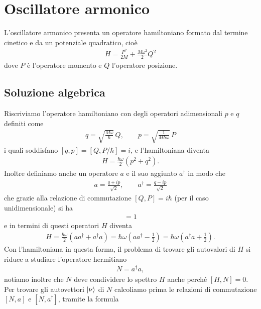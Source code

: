 \chapter{Oscillatore armonico}

L'oscillatore armonico presenta un operatore hamiltoniano formato dal termine cinetico e da un potenziale quadratico, cioè
\begin{align*}
  H = \frac{P^2}{2M} + \frac{M\omega^2}2 Q^2
\end{align*}
dove $ P $ è l'operatore momento e $ Q $ l'operatore posizione.

\section{Soluzione algebrica}

Riscriviamo l'operatore hamiltoniano con degli operatori adimensionali $ p $ e $ q $ definiti come 
\begin{align*}
  q = \sqrt{\frac{M\omega}\hbar} \, Q, \qquad p = \sqrt{\frac1{M\hbar\omega}} \, P
\end{align*}
i quali soddisfano $ [q, p] = [Q, P/\hbar] = i $, e l'hamiltoniana diventa
\begin{align*}
  H = \frac{\hbar \omega}2 \left( p^2 + q^2 \right).
\end{align*}
Inoltre definiamo anche un operatore $ a $ e il suo aggiunto $ a^\dag $ in modo che 
\begin{align*}
  a = \frac{q + ip}{\sqrt2}, \qquad a^\dag = \frac{q - ip}{\sqrt2}
\end{align*}
che grazie alla relazione di commutazione $ [Q, P ] = i \hbar $ (per il caso unidimensionale) si ha  
\begin{align*}
  [a, a^\dag] = 1
\end{align*}
e in termini di questi operatori $ H $ diventa 
\begin{align*}
  H = \frac{\hbar \omega}2 \left( aa^\dag + a^\dag a \right) = {\hbar \omega} \left( aa^\dag -\frac12 \right) 
  = {\hbar \omega} \left( a^\dag a + \frac12 \right).
\end{align*}
Con l'hamiltoniana in questa forma, il problema di trovare gli autovalori di $ H $ si riduce a studiare l'operatore hermitiano 
\begin{align*}
  N = a^\dag a,
\end{align*}
notiamo inoltre che $ N $ deve condividere lo spettro $ H $ anche perché $ [H, N] = 0 $. Per trovare gli autovettori $ \vert \nu \rangle $ di $ N $ calcoliamo 
prima le relazioni di commutazione $ [N,a] $ e $ [N, a^\dag] $, tramite la formula 
